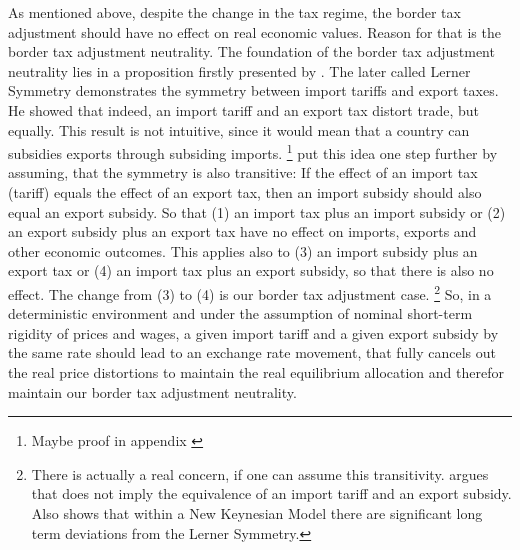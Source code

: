 As mentioned above, despite the change in the tax regime, the border tax adjustment should have no effect on real economic values. Reason for that is the border tax adjustment neutrality.
The foundation of the border tax adjustment neutrality lies in a proposition firstly presented by \cite{lerner1936symmetry}. The later called Lerner Symmetry demonstrates the symmetry between import tariffs and export taxes. He showed that indeed, an import tariff and an export tax distort trade, but equally. This result is not intuitive, since it would mean that a country can subsidies exports through subsiding imports. \footnote{Maybe proof in appendix \cite{bhagwati1998lectures}}   \cite{grossman1980border} put this idea one step further by assuming, that the symmetry is also transitive: If the effect of an import tax (tariff) equals the effect of an export tax, then an import subsidy should also equal an export subsidy. So that (1) an import tax plus an import subsidy or (2) an export subsidy plus an export tax have no effect on imports, exports and other economic outcomes. This applies also to (3) an import subsidy plus an export tax or (4) an import tax plus an export subsidy, so that there is also no effect. The change from (3) to (4) is our border tax adjustment case.  \footnote{There is actually a real concern, if one can assume this transitivity. \cite{casas1991lerner} argues that \cite{lerner1936symmetry} does not imply the equivalence of an import tariff and an export subsidy. Also \cite{linde2017macroeconomic} shows that within a New Keynesian Model there are significant long term deviations from the Lerner Symmetry.}
So, in a deterministic environment and under the assumption of nominal short-term rigidity of prices and wages, a given import tariff and a given export subsidy by the same rate should lead to an exchange rate movement, that fully cancels out the real price distortions to maintain the real equilibrium allocation and therefor maintain our border tax adjustment neutrality. \\
